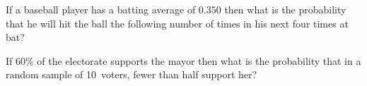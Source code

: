 \documentclass[12pt]{exam}
\newcommand\ncr[2]{\tensor[_{#1}]C{_{#2}}}
\begin{document}
\begin{questions}

\question If a baseball player has a batting average
of $0.350$ then what is the probability that he
will hit the ball the following number of times in his next four
times at bat?

\question If $60\%$ of the electorate supports the mayor
then what is the probability that in a random sample
of 10~voters, fewer than half support her?

\end{questions}
\end{document}
